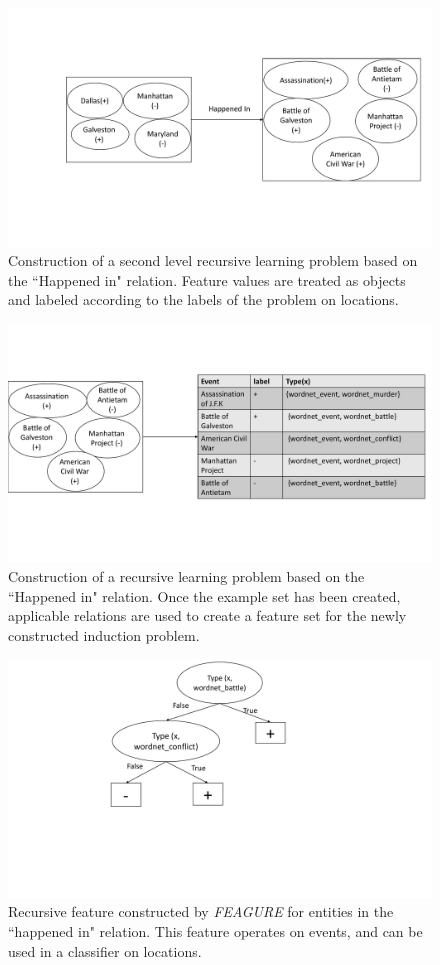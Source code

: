 \documentclass[twoside,11pt]{article}
\theoremstyle{definition}
\begin{document}
\begin{figure}[!h]
	\centering
	\includegraphics[width=0.7\linewidth]{figure_rec3_example_rec_new}
	\caption{Construction of a second level recursive learning problem based on the ``Happened in" relation. Feature values are treated as objects and labeled according to the labels of the problem on locations.}
	\label{fig:figure_rec3_example_rec}
\end{figure}

\begin{figure}[!h]
	\centering
	\includegraphics[width=\linewidth]{figure_rec3_problem_rec_new}
	\caption{Construction of a recursive learning problem based on the ``Happened in" relation. Once the example set has been created, applicable relations are used to create a feature set for the newly constructed induction problem.}
	\label{fig:figure_rec3_problem_rec}
\end{figure}

\begin{figure}[!h]
	\centering
	\includegraphics[width=0.4\linewidth]{figure_rec3_feature_rec_new}
	\caption{Recursive feature constructed by \emph{FEAGURE} for entities in the ``happened in" relation. This feature operates on events, and can be used in a classifier on locations.}
	\label{fig:figure_rec3_feature}
\end{figure}
\end{document}
